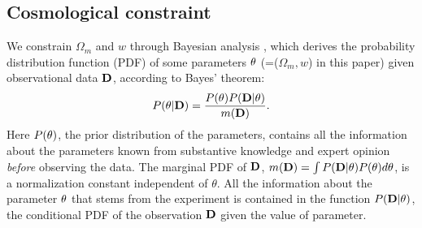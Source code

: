 \documentclass[iop]{emulateapj}
\begin{document}


\subsection{Cosmological constraint}\label{sec:constraint}


We constrain $\Omega_m$ and $w$ through Bayesian analysis \citep{Bayesian},
which derives the probability distribution function (PDF) of some parameters $\bf \theta$ (=($\Omega_m,w$) in this paper)
given observational data $\bf D$, 
according to Bayes' theorem:
\begin{equation}
 P({\bf \theta}|{\bf D}) = \frac{P({\bf \theta})P({\bf D}|{\bf \theta})}{m({\bf D})}.
\end{equation}
Here $P(\bf \theta)$, the prior distribution of the parameters,
contains all the information about the parameters known from substantive knowledge 
and expert opinion {\it before} observing the data.
The marginal PDF of $\bf D$, 
$m({\bf D})=\int P({\bf D|\theta})P({\bf \theta})d{\bf \theta}$, 
is a normalization constant independent of $\theta$.
All the information about the parameter $\bf \theta$ that stems from the experiment
is contained in the function $P({\bf D}|{\bf \theta})$, 
the conditional PDF of the observation $\bf D$ given the value of parameter.

\begin{figure*}
   \caption{\label{fig_contours}
   Likelihood contours (68.3\%, 95.4\%) in the $\Omega_m-w$ plane from our method and other cosmological probes.
   Using the BOSS DR12 galaxies within the redshift range $0.15< z< 0.693$, our method achieves tight cosmological constraints on $\Omega_m$ and $w$.
   The 2,000 MultiDark-Patchy mocks are adopted to estimate the covariance matrix in our method.
   Constraints from various probes are consistent with each other.
   See Sec. \ref{sec:constraint} for details.
   }
\end{figure*}
\end{document}
